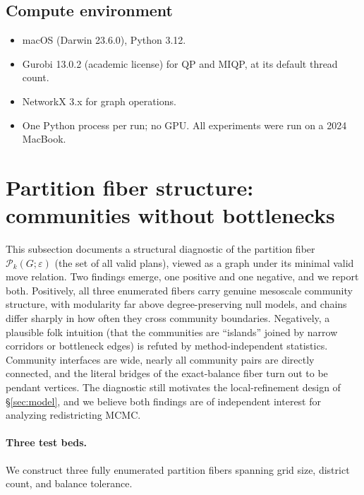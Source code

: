 \documentclass[11pt]{article}
\begin{document}
\subsection{Compute environment}\label{app:compute}

\begin{itemize}
  \item macOS (Darwin 23.6.0), Python 3.12.
  \item Gurobi 13.0.2 (academic license) for QP and MIQP, at its
    default thread count.
  \item NetworkX 3.x for graph operations.
  \item One Python process per run; no GPU. All experiments were run
    on a 2024 MacBook.
\end{itemize}

\section{Partition fiber structure: communities without bottlenecks}\label{sec:fiber-corridors}

This subsection documents a structural diagnostic of the partition fiber
$\mathcal{P}_k(G; \varepsilon)$ (the set of all valid plans), viewed as a graph under its minimal
valid move relation. Two findings emerge, one positive and one
negative, and we report both. Positively, all three enumerated fibers
carry genuine mesoscale community structure, with modularity far above
degree-preserving null models, and chains differ sharply in how often
they cross community boundaries. Negatively, a plausible folk
intuition (that the communities are ``islands'' joined by narrow
corridors or bottleneck edges) is refuted by method-independent
statistics. Community interfaces are wide, nearly all community pairs
are directly connected, and the literal bridges of the exact-balance
fiber turn out to be pendant vertices. The diagnostic still motivates
the local-refinement design of \S\ref{sec:model}, and we believe both
findings are of independent interest for analyzing redistricting
MCMC.

\paragraph{Three test beds.}\label{sec:fiber-testbeds}

We construct three fully enumerated partition fibers spanning grid
size, district count, and balance tolerance.
\end{document}
